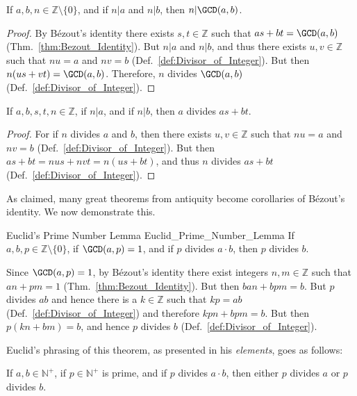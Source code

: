     \begin{theorem}
        \label{thm:Divisor_of_AB_Divides_GCD}%
        If $a,b,n\in\mathbb{Z}\setminus\{0\}$, and if $n|a$ and $n|b$,
        then $n|\GCD(a,b)$.
    \end{theorem}
    \begin{proof}
        By B\'{e}zout's identity there exists $s,t\in\mathbb{Z}$ such
        that $as+bt=\GCD(a,b)$ (Thm.~\ref{thm:Bezout_Identity}). But
        $n|a$ and $n|b$, and thus there exists $u,v\in\mathbb{Z}$ such
        that $nu=a$ and $nv=b$ (Def.~\ref{def:Divisor_of_Integer}). But
        then $n(us+vt)=\GCD(a,b)$. Therefore, $n$ divides $\GCD(a,b)$
        (Def.~\ref{def:Divisor_of_Integer}).
    \end{proof}
    \begin{theorem}
        \label{thm:n_Div_AB_then_A_Div_AS_BT}%
        If $a,b,s,t,n\in\mathbb{Z}$, if $n|a$, and if $n|b$, then $a$
        divides $as+bt$.
    \end{theorem}
    \begin{proof}
        For if $n$ divides $a$ and $b$, then there exists
        $u,v\in\mathbb{Z}$ such that $nu=a$ and $nv=b$
        (Def.~\ref{def:Divisor_of_Integer}). But then
        $as+bt=nus+nvt=n(us+bt)$, and thus $n$ divides $as+bt$
        (Def.~\ref{def:Divisor_of_Integer}).
    \end{proof}
    As claimed, many great theorems from antiquity become corollaries of
    B\'{e}zout's identity. We now demonstrate this.
    \begin{ftheorem}{Euclid's Prime Number Lemma}
                    {Euclid_Prime_Number_Lemma}
        If $a,b,p\in\mathbb{Z}\setminus\{0\}$, if $\GCD(a,p)=1$, and if
        $p$ divides $a\cdot{b}$, then $p$ divides $b$.
    \end{ftheorem}
    \begin{bproof}
        Since $\GCD(a,p)=1$, by B\'{e}zout's identity there exist
        integers $n,m\in\mathbb{Z}$ such that $an+pm=1$
        (Thm.~\ref{thm:Bezout_Identity}). But then $ban+bpm=b$. But $p$
        divides $ab$ and hence there is a $k\in\mathbb{Z}$ such that
        $kp=ab$ (Def.~\ref{def:Divisor_of_Integer}) and therefore
        $kpn+bpm=b$. But then $p(kn+bm)=b$, and hence $p$ divides $b$
        (Def.~\ref{def:Divisor_of_Integer}).
    \end{bproof}
    Euclid's phrasing of this theorem, as presented in his
    \textit{elements}, goes as follows:
    \begin{theorem}
        \label{thm:Prime_Div_AB_then_PdivA_or_PdivB}%
        If $a,b\in\mathbb{N}^{+}$, if $p\in\mathbb{N}^{+}$ is prime, and
        if $p$ divides $a\cdot{b}$, then either $p$ divides $a$ or $p$
        divides $b$.
    \end{theorem}
